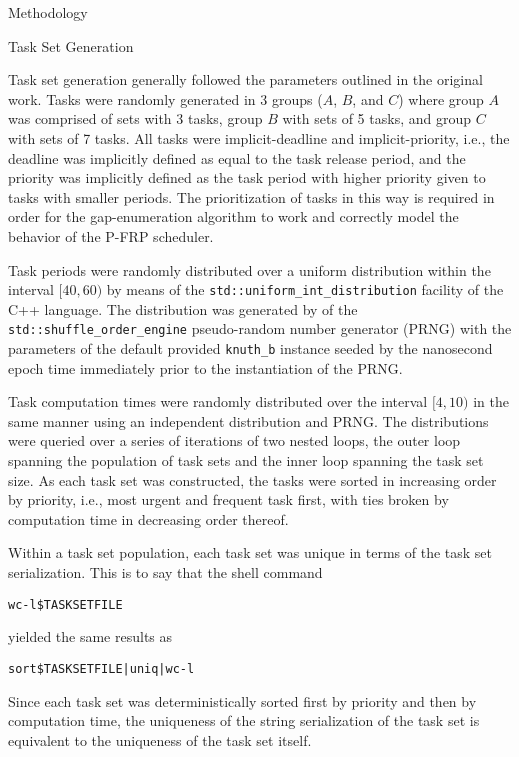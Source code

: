 \documentclass{article}
\begin{document}
\begin{section}{Methodology}
  \begin{subsection}{Task Set Generation}
    \begin{paragraph}{}
      Task set generation generally followed the parameters outlined in the original work\autocite[14]{BelwalCheng}.
      Tasks were randomly generated in 3 groups ($A$, $B$, and $C$) where group $A$ was
      comprised of sets with 3 tasks, group $B$ with sets of 5 tasks, and group $C$ with
      sets of 7 tasks. All tasks were implicit-deadline and implicit-priority, i.e.,
      the deadline was implicitly defined as equal to the task release period,
      and the priority was implicitly defined as the task period with higher priority
      given to tasks with smaller periods. The prioritization of tasks in this way is
      required in order for the gap-enumeration algorithm to work and correctly model
      the behavior of the P-FRP scheduler.
    \end{paragraph}
    \begin{paragraph}{}
      Task periods were randomly distributed over a uniform distribution within the
      interval ${[}40,60{)}$ by means of the \texttt{std::uniform\_int\_distribution}
      facility of the C++ language\autocite{stduniformintdist}. The distribution
      was generated by of the
      \texttt{std::shuffle\_order\_engine}\autocite{stdshuffleorderengine} pseudo-random
      number generator (PRNG) with the parameters of the default provided \texttt{knuth\_b}
      instance seeded by the nanosecond epoch time immediately prior to the instantiation
      of the PRNG.
    \end{paragraph}
    \begin{paragraph}{}
      Task computation times were randomly distributed over the interval ${[}4,10{)}$
      in the same manner using an independent distribution and PRNG. The distributions
      were queried over a series of iterations of two nested loops, the outer loop
      spanning the population of task sets and the inner loop spanning the task set size.
      As each task set was constructed, the tasks were sorted in increasing order by
      priority, i.e., most urgent and frequent task first, with ties broken by
      computation time in decreasing order thereof.
    \end{paragraph}
    \begin{paragraph}{}
      Within a task set population, each task set was unique in terms of the task
      set serialization. This is to say that the shell command
      \begin{alltt}
        wc -l \$TASKSETFILE
      \end{alltt}
      yielded the same results as
      \begin{alltt}
        sort \$TASKSETFILE | uniq | wc -l
      \end{alltt}
      Since each task set was deterministically sorted first by priority and then by
      computation time, the uniqueness of the string serialization of the task set is
      equivalent to the uniqueness of the task set itself.
    \end{paragraph}
  \end{subsection}


\end{section}
\end{document}
